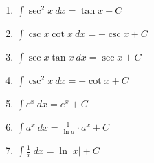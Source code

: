 {\begin{minipage}[t]{.55\specialboxlength}
\begin{enumerate}
\item $\int \sec^2 x\ dx = \tan x+C$\myrule
\item $\int \csc x\cot  x\ dx = -\csc x+C$\myrule
\item $\int \sec x\tan x\ dx = \sec x+C$\myrule
\item $\int \csc^2 x\ dx = -\cot x+C$\myrule
\item $\int e^x\ dx = e^x+C$\myrule
\item $\int a^x\ dx = \frac{1}{\ln a}\cdot a^x+C$\myrule
\item $\int \frac{1}x\ dx = \ln |x|+C$\myrule
\end{enumerate}
\end{minipage}%
%
}
%
